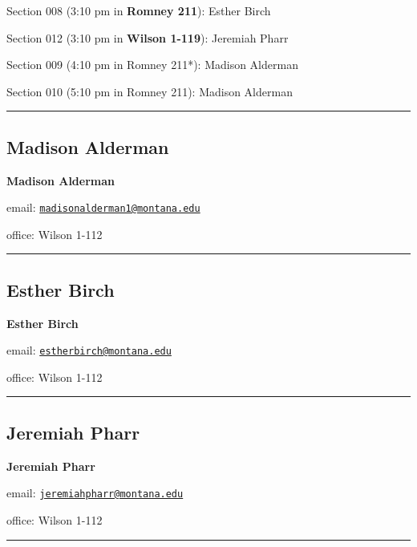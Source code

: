 \documentclass[
]{article}
\begin{document}
Section 008 (3:10 pm in \textbf{Romney 211}): Esther Birch

Section 012 (3:10 pm in \textbf{Wilson 1-119}): Jeremiah Pharr

Section 009 (4:10 pm in Romney 211*): Madison Alderman

Section 010 (5:10 pm in Romney 211): Madison Alderman

\begin{center}\rule{0.5\linewidth}{0.5pt}\end{center}

\subsection{Madison Alderman}\label{madison-alderman}

\textbf{Madison Alderman}

email:
\href{mailto:madisonalderman1@montana.edu}{\nolinkurl{madisonalderman1@montana.edu}}

office: Wilson 1-112

\begin{center}\rule{0.5\linewidth}{0.5pt}\end{center}

\subsection{Esther Birch}\label{esther-birch}

\textbf{Esther Birch}

email:
\href{mailto:estherbirch@montana.edu}{\nolinkurl{estherbirch@montana.edu}}

office: Wilson 1-112

\begin{center}\rule{0.5\linewidth}{0.5pt}\end{center}

\subsection{Jeremiah Pharr}\label{jeremiah-pharr}

\textbf{Jeremiah Pharr}

email:
\href{mailto:jeremiahpharr@montana.edu}{\nolinkurl{jeremiahpharr@montana.edu}}

office: Wilson 1-112

\begin{center}\rule{0.5\linewidth}{0.5pt}\end{center}
\end{document}
